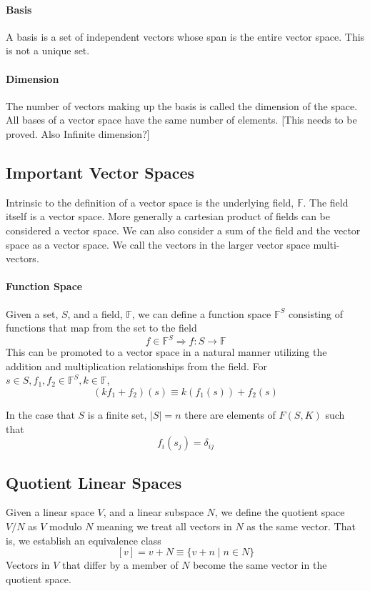 \documentclass[a4paper]{scrartcl}
\begin{document}
\paragraph{Basis}
A basis is a set of independent vectors whose span is the entire vector space. This is not a unique set.
\paragraph{Dimension}
The number of vectors making up the basis is called the dimension of the space. All bases of a vector space have the same number of elements. [This needs to be proved. Also Infinite dimension?]

\subsection{Important Vector Spaces}
Intrinsic to the definition of a vector space is the underlying field, $\mathbb{F}$. The field itself is a vector space.
More generally a cartesian product of fields can be considered a vector space. We can also consider a sum of the field and the vector space as a vector space. We call the vectors in the larger vector space multi-vectors.
\paragraph{Function Space}
Given a set, $S$, and a field, $\mathbb{F}$, we can define a function space $\mathbb{F}^{S}$ consisting of functions that map from the set to the field
$$f\in \mathbb{F}^{S} \Rightarrow f: S\rightarrow \mathbb{F}$$
This can be promoted to a vector space in a natural manner utilizing the addition and multiplication relationships from the field. For $s\in S, f_{1},f_{2}\in \mathbb{F}^{S}, k\in \mathbb{F}$,
$$(kf_{1}+f_{2})(s)\equiv k(f_{1}(s))+f_{2}(s)$$

In the case that $S$ is a finite set, $\mid S\mid = n$ there are elements of $F(S,K)$ such that
$$f_{i}(s_{j})=\delta_{ij}$$



\subsection{Quotient Linear Spaces}
Given a linear space $V$, and a linear subspace $N$, we define the quotient space $V/N$ as $V$ modulo $N$ meaning we treat all vectors in $N$ as the same vector. That is, we establish an equivalence class 
	$$[v] = v + N \equiv \{v+n\mid n\in N\}$$
Vectors in $V$ that differ by a member of $N$ become the same vector in the quotient space.
\end{document}
